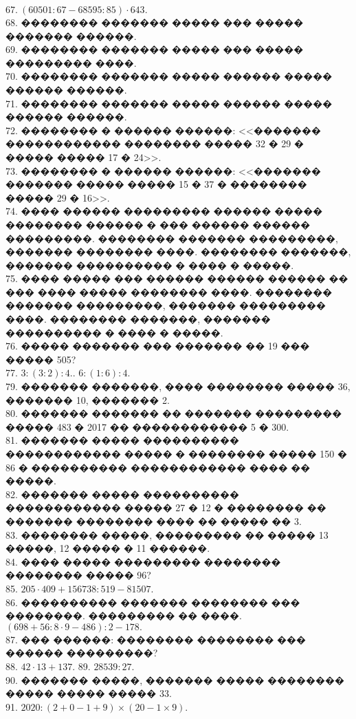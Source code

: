 \documentclass[12pt]{article}
\begin{document}
$67.\ (60501:67-68595:85)\cdot643.$\\
68. �������� ������� ����� ��� ����� ������� ������.\\
69. �������� ������� ����� ��� ����� ��������� ����.\\
70. �������� ������� ����� ������ ����� ������ ������.\\
71. �������� ������� ����� ������ ����� ������ ������.\\
72. �������� � ������ ������: <<������� ������������ �������� ����� 32 � 29 � ����� ����� 17 � 24>>.\\
73. �������� � ������ ������: <<������� ������� ����� ����� 15 � 37 � �������� ����� 29 � 16>>.\\
74. ���� ������ ��������� ������ ����� �������� ������ � ��� ������ ������ ���������. �������� ������� ���������, ������� �������� ����. �������� �������, ������� ���������� � ���� � �����.\\
75. ���� ����� ��� ������ ������ ������ �� ��� ���� ����� �������� ����. �������� ������� ���������, ������� ��������� ����. �������� �������, ������� ���������� � ���� � �����.\\
76. ����� ������� ��� ������� �� 19 ��� ����� 505?\\
77. $3:(3:2):4.$\qquad  {}. $6:(1:6):4.$\\
79. ������� �������, ���� �������� ����� 36, ������� 10, ������� 2.\\
80. ������� ������� �� ������� ��������� ����� 483 � 2017 �� ������������ 5 � 300.\\
81. ������� ����� ���������� ������������ ����� � �������� ����� 150 � 86 � ���������� ������������ ���� �� �����.\\
82. ������� ����� ���������� ������������ ����� 27 � 12 � �������� �� ������� �������� ���� �� ����� �� 3.\\
83. �������� �����, ��������� �� ����� 13 �����, 12 ����� � 11 ������.\\
84. ���� ����� ��������� �������� �������� ����� 96?\\
85. $205\cdot409+156738:519-81507.$\\
86. ���������� ������� �������� ��� ��������. ��������� �� ����.\\
$(698+56:8\cdot9-486):2-178.$\\
87. ��� ������: �������� �������� ��� ������ ���������?\\
88. $42\cdot13+137.$ 89. $28539:27.$\\ 90. ������� �����, ������� ����� �������� ����� ����� ����� 33. \\  91. $2020:(2+0-1+9) \times (20-1 \times 9).$\qquad
\end{document}
